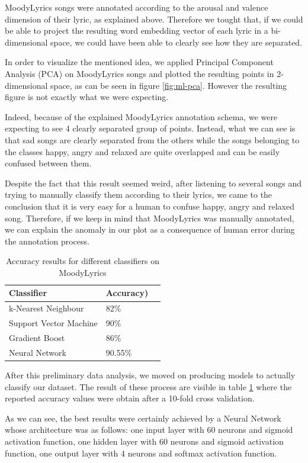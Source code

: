 MoodyLyrics songs were annotated according to the arousal and valence dimension of their lyric,
as explained above. Therefore we tought that, if we could be able to project the resulting
word embedding vector of each lyric in a bi-dimensional space, we could have been able to 
clearly see how they are separated.

In order to visualize the mentioned idea, we applied Principal Component Analysis (PCA) on
MoodyLyrics songs and plotted the resulting points in 2-dimensional space, as can be seen in 
figure \ref{fig:ml-pca}. However the resulting figure is not exactly what we were expecting.

Indeed, because of the explained MoodyLyrics annotation schema, we were expecting to see 4
clearly separated group of points. Instead, what we can see is that sad songs are clearly 
separated from the others while the songs belonging to the classes happy, angry and relaxed
are quite overlapped and can be easily confused between them.

Despite the fact that this result seemed weird, after listening to several songs and trying to
manually classify them according to their lyrics, we came to the conclusion that it is very
easy for a human to confuse happy, angry and relaxed song. Therefore, if we keep in mind that
MoodyLyrics was manually annotated, we can explain the anomaly in our plot as a consequence
of human error during the annotation process.

\begin{table}[]
\centering
\begin{tabular}{@{}lll@{}}
\toprule
\textbf{Classifier} & \textbf{Accuracy})   \\ \midrule
k-Nearest Neighbour & 82\%  \\
Support Vector Machine & 90\%  \\
Gradient Boost & 86\%  \\
Neural Network & 90.55\%  \\
\end{tabular}
\caption{Accuracy results for different classifiers on MoodyLyrics}
\label{table:ml-simple-results}
\end{table}

After this preliminary data analysis, we moved on producing models to actually classify our dataset.
The result of these process are visible in table \ref{table:ml-simple-results} where the reported
accuracy values were obtain after a 10-fold cross validation.

As we can see, the best results were certainly achieved by a Neural Network whose architecture was
as follows: one input layer with 60 neurons and sigmoid activation function, one hidden layer with
60 neurons and sigmoid activation function, one output layer with 4 neurons and softmax activation
function.

